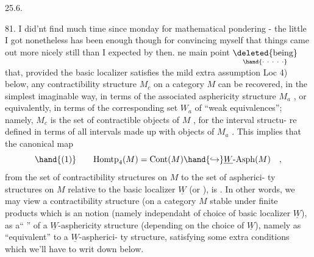 
25.6.

81. I did'nt find much time since monday for mathematical pondering -
the little I got nonetheless has been enough though for convincing myself
that things came out  more nicely still than I expected by then. \hand{\unsure{--}} ne
main point \(\underset{\hand{\cdot\ \cdot\ \cdot\ \cdot\ \cdot}}{\text{\deleted{being}}}\) that, provided the basic localizer  satisfies the mild
extra assumption Loc 4) below, any contractibility structure $M_c$ on a
category $M$   can be recovered, in the simplest imaginable way, in
terms of the associated asphericity structure $M_a$ , or equivalently, in
terms of the corresponding set $W_a$ of ``weak equivalences''; namely, $M_c$
is the set of contractible objects of $M$ , for the   interval structu-%
re defined in terms of all intervals made up with objects of $M_a$  . This
implies that the canonical map
\[ \hand{(1)} \qquad \mathrm{Homtp}_4(M) = \mathrm{Cont}(M) \hand{\hookrightarrow} \underline{W}\text{-}\mathrm{Asph}(M) \quad , \]
from the set of contractibility structures on $M$ to the set of aspherici-%
ty structures on $M$ relative to the basic localizer $\underline{W}$ (or ), is \hand{\uline{\textcolor{black}{injective}}}. In other words, we may view 
a contractibility structure (on a category $M$ stable under finite products\hand{),}
which is an \hand{\uline{\textcolor{black}{absolute}}} notion (namely independaht of  choice of 
 basic localizer $\underline{W}$), as a``\hand{\uline{\textcolor{black}{particular}}} \hand{\uline{\textcolor{black}{case}}}'' of a $\underline{W}$-asphericity structure
(depending on the choice of $\underline{W}$), namely as ``equivalent'' to a $\underline{W}$-aspherici-%
ty structure, satisfying some extra conditions which we'll have to writ
down below. \hand{//}

